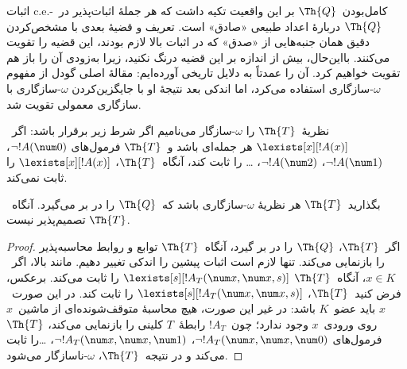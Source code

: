 \documentclass[../../../include/open-logic-section]{subfiles}
\begin{document}


\begin{explain}
اثبات c.e.-کامل‌بودن~$\Th{Q}$ بر این واقعیت تکیه داشت که هر جملهٔ
اثبات‌پذیر در~$\Th{Q}$ دربارهٔ اعداد طبیعی «صادق» است. تعریف و قضیهٔ
بعدی با مشخص‌کردن دقیق همان جنبه‌هایی از «صدق» که در اثبات بالا لازم
بودند، این قضیه را تقویت می‌کنند. بااین‌حال، بیش از اندازه بر این قضیه
درنگ نکنید، زیرا به‌زودی آن را باز هم تقویت خواهیم کرد. آن را عمدتاً
به دلایل تاریخی آورده‌ایم: مقالهٔ اصلی گودل از مفهوم
$\omega$-سازگاری استفاده می‌کرد، اما اندکی بعد نتیجهٔ او با
جایگزین‌کردن $\omega$-سازگاری با سازگاری معمولی تقویت شد.
\end{explain}

\begin{defn}
نظریهٔ~$\Th{T}$ را $\omega$-سازگار می‌نامیم اگر شرط زیر برقرار باشد:
اگر~$\lexists[x][!A(x)]$ هر جمله‌ای باشد و~$\Th{T}$ فرمول‌های
$\lnot !A(\num 0)$، $\lnot !A(\num 1)$، $\lnot !A(\num 2)$، \dots
را ثابت کند، آنگاه~$\Th{T}$، $\lexists[x][!A(x)]$ را ثابت نمی‌کند.
\end{defn}

\begin{thm}
  بگذارید~$\Th{T}$ هر نظریهٔ $\omega$-سازگاری باشد که~$\Th{Q}$ را
  در بر می‌گیرد. آنگاه~$\Th{T}$ تصمیم‌پذیر نیست.
\end{thm}

\begin{proof}
اگر~$\Th{T}$، $\Th{Q}$ را در بر گیرد، آنگاه~$\Th{T}$ توابع و روابط
محاسبه‌پذیر را بازنمایی می‌کند. تنها لازم است اثبات پیشین را اندکی
تغییر دهیم. مانند بالا، اگر~$x \in K$، آنگاه~$\Th{T}$
$\lexists[s][!A_T(\num x,\num x, s)]$ را ثابت می‌کند. برعکس، فرض
کنید~$\Th{T}$، $\lexists[s][!A_T(\num x, \num x, s)]$ را ثابت کند.
در این صورت~$x$ باید عضو~$K$ باشد: در غیر این صورت، هیچ محاسبهٔ
متوقف‌شونده‌ای از ماشین~$x$ روی ورودی~$x$ وجود ندارد؛ چون~$!A_T$
رابطهٔ~$T$ کلینی را بازنمایی می‌کند، $\Th{T}$ فرمول‌های
$\lnot !A_T(\num x, \num x, \num 0)$،
$\lnot !A_T(\num x, \num x, \num 1)$، \dots را ثابت می‌کند و در
نتیجه~$\Th{T}$، $\omega$-ناسازگار می‌شود.
\end{proof}
\end{document}
